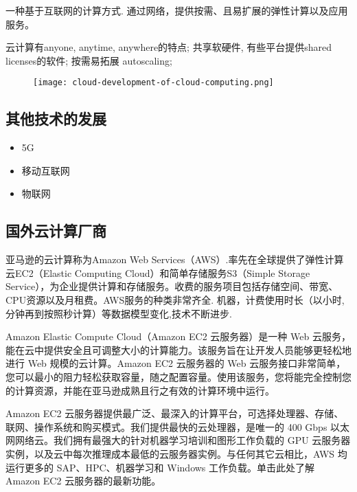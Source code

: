 \begin{definition}[云计算]
    一种基于互联网的计算方式. 通过网络，提供按需、且易扩展的弹性计算以及应用服务。
\end{definition}

云计算有anyone, anytime, anywhere的特点; 共享软硬件, 有些平台提供shared licenses的软件; 按需易拓展 autoscaling; 

\begin{figure}[htbp]
    \centering
    \texttt{[image: cloud-development-of-cloud-computing.png]}
\end{figure}

\subsection{其他技术的发展}

\begin{itemize}
    \item 5G
    \item 移动互联网
    \item 物联网
\end{itemize}

\subsection{国外云计算厂商}

亚马逊的云计算称为Amazon Web Services（AWS）.率先在全球提供了弹性计算云EC2（Elastic Computing Cloud）和简单存储服务S3（Simple Storage Service），为企业提供计算和存储服务。收费的服务项目包括存储空间、带宽、CPU资源以及月租费。AWS服务的种类非常齐全. 
机器，计费使用时长（以小时, 分钟再到按照秒计算）等数据模型变化,技术不断进步.

\begin{definition}
    Amazon Elastic Compute Cloud（Amazon EC2 云服务器）是一种 Web 云服务，能在云中提供安全且可调整大小的计算能力。该服务旨在让开发人员能够更轻松地进行 Web 规模的云计算。Amazon EC2 云服务器的 Web 云服务接口非常简单，您可以最小的阻力轻松获取容量，随之配置容量。使用该服务，您将能完全控制您的计算资源，并能在亚马逊成熟且行之有效的计算环境中运行。

    Amazon EC2 云服务器提供最广泛、最深入的计算平台，可选择处理器、存储、联网、操作系统和购买模式。我们提供最快的云处理器，是唯一的 400 Gbps 以太网网络云。我们拥有最强大的针对机器学习培训和图形工作负载的 GPU 云服务器实例，以及云中每次推理成本最低的云服务器实例。与任何其它云相比，AWS 均运行更多的 SAP、HPC、机器学习和 Windows 工作负载。单击此处了解 Amazon EC2 云服务器的最新功能。
\end{definition}

